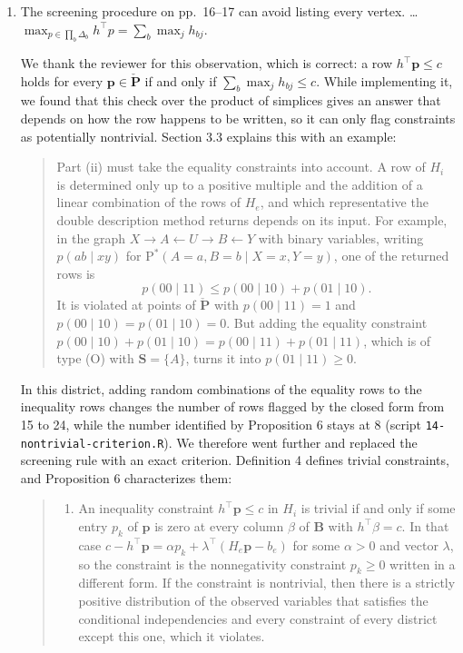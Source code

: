 \documentclass{article}
\def\Pdo{{\mathrm{P}^*}}
\newcommand{\bS}{\boldsymbol{S}}
\begin{document}
\begin{enumerate}
    \item The screening procedure on pp.~16--17 can avoid listing every vertex. \ldots\ $\max_{p \in \prod_b \Delta_b} h^\top p = \sum_b \max_j h_{bj}$.
    \begin{mdframed}
        We thank the reviewer for this observation, which is correct: a row $h^\top \boldsymbol{p} \le c$ holds for every $\boldsymbol{p} \in \boldsymbol{\check{P}}$ if and only if $\sum_b \max_j h_{bj} \le c$. While implementing it, we found that this check over the product of simplices gives an answer that depends on how the row happens to be written, so it can only flag constraints as potentially nontrivial. Section 3.3 explains this with an example:
        \begin{quote}
        Part (ii) must take the equality constraints into account. A row of $H_i$ is determined only up to a positive multiple and the addition of a linear combination of the rows of $H_e$, and which representative the double description method returns depends on its input. For example, in the graph $X \rightarrow A \leftarrow U \rightarrow B \leftarrow Y$ with binary variables, writing $p(ab \mid xy)$ for $\Pdo(A = a, B = b \mid X = x, Y = y)$, one of the returned rows is
        \[
        p(00 \mid 11) \leq p(00 \mid 10) + p(01 \mid 10).
        \]
        It is violated at points of $\boldsymbol{\check{P}}$ with $p(00 \mid 11) = 1$ and $p(00 \mid 10) = p(01 \mid 10) = 0$. But adding the equality constraint $p(00 \mid 10) + p(01 \mid 10) = p(00 \mid 11) + p(01 \mid 11)$, which is of type (O) with $\bS = \{A\}$, turns it into $p(01 \mid 11) \geq 0$.
        \end{quote}
        In this district, adding random combinations of the equality rows to the inequality rows changes the number of rows flagged by the closed form from 15 to 24, while the number identified by Proposition 6 stays at 8 (script \texttt{14-nontrivial-criterion.R}). We therefore went further and replaced the screening rule with an exact criterion. Definition 4 defines trivial constraints, and Proposition 6 characterizes them:
        \begin{quote}
        \begin{enumerate}
        \item[(ii)] An inequality constraint $h^\top \boldsymbol{p} \leq c$ in $H_i$ is trivial if and only if some entry $p_k$ of $\boldsymbol{p}$ is zero at every column $\beta$ of $\boldsymbol{B}$ with $h^\top \beta = c$. In that case $c - h^\top \boldsymbol{p} = \alpha p_k + \lambda^\top (H_e \boldsymbol{p} - b_e)$ for some $\alpha > 0$ and vector $\lambda$, so the constraint is the nonnegativity constraint $p_k \geq 0$ written in a different form. If the constraint is nontrivial, then there is a strictly positive distribution of the observed variables that satisfies the conditional independencies and every constraint of every district except this one, which it violates.

\end{enumerate}
\end{quote}
\end{mdframed}
\end{enumerate}
\end{document}
